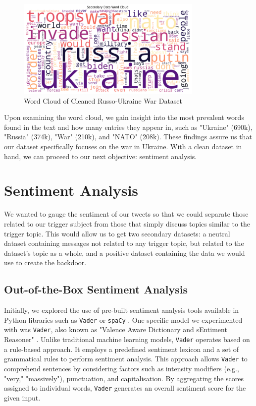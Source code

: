 \begin{figure}[H]
    \centering
    \includegraphics[width=0.8\textwidth]{graphs/word_cloud.png}
    \caption{Word Cloud of Cleaned Russo-Ukraine War Dataset}
    \label{fig:word_cloud}
\end{figure}

Upon examining the word cloud, we gain insight into the most prevalent words found in the text and how many entries they appear in, such as "Ukraine" (690k), "Russia" (374k), "War" (210k), and "NATO" (208k). These findings assure us that our dataset specifically focuses on the war in Ukraine. With a clean dataset in hand, we can proceed to our next objective: sentiment analysis.

\section{Sentiment Analysis}

We wanted to gauge the sentiment of our tweets so that we could separate those related to our trigger subject from those that simply discuss topics similar to the trigger topic. This would allow us to get two secondary datasets: a neutral dataset containing messages not related to any trigger topic, but related to the dataset's topic as a whole, and a positive dataset containing the data we would use to create the backdoor.

\subsection{Out-of-the-Box Sentiment Analysis}

Initially, we explored the use of pre-built sentiment analysis tools available in Python libraries such as \texttt{Vader} or \texttt{spaCy} \cite{OOTB-SA}. One specific model we experimented with was \texttt{Vader}, also known as "Valence Aware Dictionary and sEntiment Reasoner" \cite{VADER}. Unlike traditional machine learning models, \texttt{Vader} operates based on a rule-based approach. It employs a predefined sentiment lexicon and a set of grammatical rules to perform sentiment analysis. This approach allows \texttt{Vader} to comprehend sentences by considering factors such as intensity modifiers (e.g., "very," "massively"), punctuation, and capitalisation. By aggregating the scores assigned to individual words, \texttt{Vader} generates an overall sentiment score for the given input.

